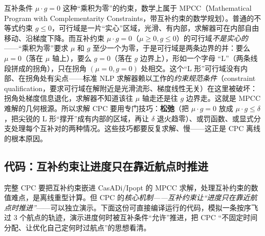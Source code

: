 \begin{derivation}\label{der:st-mpcc}
互补条件 $\mu\cdot g=0$ 这种“乘积为零”的约束，数学上属于 MPCC（Mathematical Program with Complementarity Constraints，带互补约束的数学规划）。普通的不等式约束 $g\le 0$，可行域是一片“实心”区域，光滑、有内部，求解器可在内部自由移动、沿梯度下降。而互补约束 $\mu\cdot g=0$（$\mu\ge 0,g\le 0$）的可行域\emph{不是实心的}——“乘积为零”要求 $\mu$ 和 $g$ 至少一个为零，于是可行域是两条边界的并：要么 $\mu=0$（落在 $\mu$ 轴上），要么 $g=0$（落在 $g$ 边界上），形如一个字母 “L”（两条线段拼成的拐角），只在拐角 $(\mu=0,g=0)$ 处相交。这个“L 形”可行域没有内部、在拐角处有尖点——标准 NLP 求解器赖以工作的\emph{约束规范条件}（constraint qualification，要求可行域在解附近是光滑流形、梯度线性无关）在这里被破坏：拐角处梯度信息退化，求解器不知道该往 $\mu$ 轴走还是往 $g$ 边界走。这就是 MPCC 难解的几何根源。所以求解 CPC 要用专门技巧：\textbf{松弛}（把 $\mu\cdot g=0$ 放成 $\mu\cdot g\le\delta$，把尖锐的 L 形“撑开”成有内部的区域，再让 $\delta$ 退火趋零）、或罚函数、或显式分支处理每个互补对的两种情况。这些技巧都要反复求解、慢——这正是 CPC 离线的根本原因。
\end{derivation}

\subsection{代码：互补约束让进度只在靠近航点时推进}
\label{sec:st-cpc-code}

完整 CPC 要把互补约束嵌进 CasADi/Ipopt 的 MPCC 求解，处理互补约束的数值难点，是离线重型计算。但 CPC 的\emph{核心机制——互补约束让“进度只在靠近航点时推进”}——可以独立演示。下面这份可直接编译运行的代码，模拟一条按序飞过 $3$ 个航点的轨迹，演示进度何时被互补条件“允许”推进，把 CPC “不固定时间分配、让优化自己定何时过航点”的思想看清。

